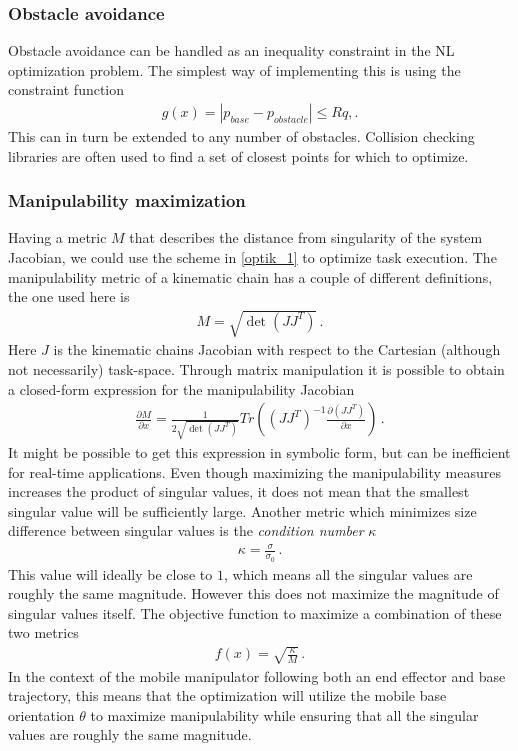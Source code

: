 \documentclass[times, utf8, diplomski, english]{fer}
\begin{document}
\subsubsection{Obstacle avoidance}
Obstacle avoidance can be handled as an inequality constraint in the NL optimization problem.
The simplest way of implementing this is using the constraint function
\begin{align}
g\left(x\right) = \left\vert p_{base} - p_{obstacle} \right\vert \leq Rq, .
\end{align}
This can in turn be extended to any number of obstacles.
Collision checking libraries are often used to find a set of closest points for which to optimize.
\subsubsection{Manipulability maximization}
Having a metric $M$ that describes the distance from singularity of the system Jacobian, we could use the scheme in \eqref{optik_1} to optimize task execution.
The manipulability metric of a kinematic chain has a couple of different definitions, the one used here is
\begin{align}
M = \sqrt{\det{\left(JJ^T\right)}}\, .
\end{align}
Here $J$ is the kinematic chains Jacobian with respect to the Cartesian (although not necessarily) task-space.
Through matrix manipulation it is possible to obtain a closed-form expression for the manipulability Jacobian
\begin{align}
\frac{\partial M}{\partial x} = \frac{1}{2\sqrt{\det{\left(JJ^T\right)}}} Tr\left(\left(JJ^T\right)^{-1}\frac{\partial \left(JJ^T\right)}{\partial x}\right)\, .
\end{align}
It might be possible to get this expression in symbolic form, but can be inefficient for real-time applications.
Even though maximizing the manipulability measures increases the product of singular values, it does not mean that the smallest singular value will be sufficiently large. 
Another metric which minimizes size difference between singular values is the \textit{condition number} $\kappa$
\begin{align}\label{eq:condition number}
\kappa = \frac{\sigma}{\sigma_0}\, .
\end{align}
This value will ideally be close to $1$, which means all the singular values are roughly the same magnitude.
However this does not maximize the magnitude of singular values itself.
The objective function to maximize a combination of these two metrics
\begin{align}
\label{mnptik_1}
f\left(x\right) = \sqrt{\frac{\kappa}{M}}\, .
\end{align}
In the context of the mobile manipulator following both an end effector and base trajectory, this means that the optimization will utilize the mobile base orientation $\theta$ to maximize manipulability while ensuring that all the singular values are roughly the same magnitude.
\end{document}
